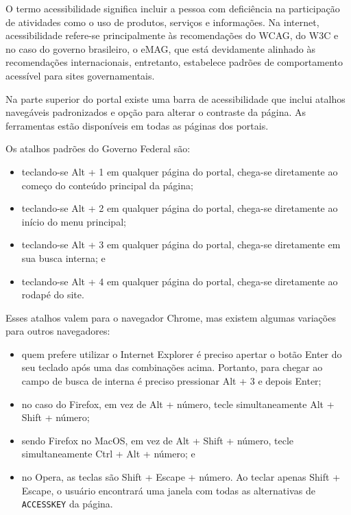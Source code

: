 \documentclass[
  12pt,
  openright,
  twoside,
  a4paper,
  english,
  french,
  spanish,
  brazil
]{abntex2}
\begin{document}
O termo acessibilidade significa incluir a pessoa com deficiência na
participação de atividades como o uso de produtos, serviços e informações. Na
internet, acessibilidade refere-se principalmente às recomendações do WCAG, do
W3C e no caso do governo brasileiro, o eMAG, que está devidamente alinhado às
recomendações internacionais, entretanto, estabelece padrões de comportamento
acessível para sites governamentais.

Na parte superior do portal existe uma barra de acessibilidade que inclui
atalhos navegáveis padronizados e opção para alterar o contraste da página. As
ferramentas estão disponíveis em todas as páginas dos portais.

Os atalhos padrões do Governo Federal são:

\begin{itemize}
  \item
    teclando-se Alt + 1 em qualquer página do portal, chega-se diretamente ao
    começo do conteúdo principal da página;
  \item
    teclando-se Alt + 2 em qualquer página do portal, chega-se diretamente ao
    início do menu principal;
  \item
    teclando-se Alt + 3 em qualquer página do portal, chega-se diretamente em
    sua busca interna; e
  \item
    teclando-se Alt + 4 em qualquer página do portal, chega-se diretamente ao
    rodapé do site.
\end{itemize}

Esses atalhos valem para o navegador Chrome, mas existem algumas variações para
outros navegadores:

\begin{itemize}
  \item
    quem prefere utilizar o Internet Explorer é preciso apertar o botão Enter do
    seu teclado após uma das combinações acima. Portanto, para chegar ao campo
    de busca de interna é preciso pressionar Alt + 3 e depois Enter;
  \item
    no caso do Firefox, em vez de Alt + número, tecle simultaneamente Alt +
    Shift + número;
  \item
    sendo Firefox no MacOS, em vez de Alt + Shift + número, tecle
    simultaneamente Ctrl + Alt + número; e
  \item
    no Opera, as teclas são Shift + Escape + número. Ao teclar apenas Shift +
    Escape, o usuário encontrará uma janela com todas as alternativas de
    \texttt{ACCESSKEY} da página.
\end{itemize}
\end{document}
